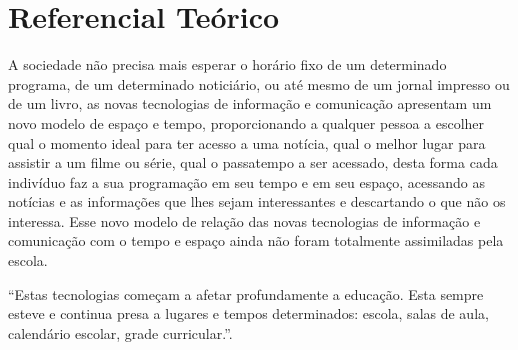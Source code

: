 \documentclass[12pt, openright, a4paper, brazil, english, french, spanish, bibjustif, openany, oneside]{abntex2}
\begin{document}




\chapter{Referencial Teórico}

A sociedade não precisa mais esperar o horário fixo de um determinado programa, de um determinado noticiário, ou até mesmo de um jornal impresso ou de um livro, as novas tecnologias de informação e comunicação apresentam um novo modelo de espaço e tempo, proporcionando a qualquer pessoa a escolher qual o momento ideal para ter acesso a uma notícia, qual o melhor lugar para assistir a um filme ou série, qual o passatempo a ser acessado, desta forma cada indivíduo faz a sua programação em seu tempo e em seu espaço, acessando as notícias e as informações que lhes sejam interessantes e descartando o que não os interessa. Esse novo modelo de relação das novas tecnologias de informação e comunicação com o tempo e espaço ainda não foram totalmente assimiladas pela escola.

\begin{citacao}

``Estas tecnologias começam a afetar profundamente a educação. Esta sempre esteve e continua presa a lugares e tempos determinados: escola, salas de aula, calendário escolar, grade curricular.''\cite{moran}.

\end{citacao}
\end{document}
